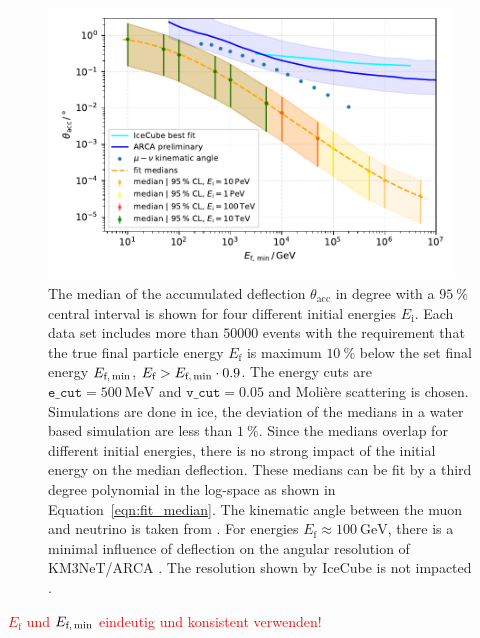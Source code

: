 \documentclass[pdflatex, sn-mathphys]{sn-jnl}%
\theoremstyle{thmstyleone}%
\theoremstyle{thmstyletwo}%
\theoremstyle{thmstylethree}%
\begin{document}
\begin{figure}
    \centering 
    \includegraphics[width=0.96\textwidth]{../../deflection/plots/FINAL/fit_median_defl_cut_10percent_only_poly_new_resolution_rescale_no_icecube_paper_final.pdf}
    \caption{The median of the accumulated deflection $\theta_{\text{acc}}$ in degree 
    with a $\SI{95}{\percent}$ 
    central interval is shown for four different initial energies $E_{\text{i}}$. 
    Each data set includes more than $\num{50000}$ events with the requirement 
    that the true final particle energy $E_{\text{f}}$ is maximum 
    $\SI{10}{\percent}$ below the set final energy $E_{\text{f,\,min}}$,   
    $E_{\text{f}} > E_{\text{f,\,min}} \cdot 0.9$. The energy cuts are $\texttt{e\_cut} = \SI{500}{\mega\electronvolt}$ and $\texttt{v\_cut} = 0.05$ and 
    Molière scattering is chosen. Simulations are done in ice, the deviation 
    of the medians in a water based simulation are less than $\SI{1}{\percent}$.
    Since the medians overlap for different initial energies, there is no 
    strong impact of the initial energy on the median deflection. These 
    medians can be fit by a third degree polynomial in the log-space as 
    shown in Equation~\ref{eqn:fit_median}. The kinematic angle between the muon and 
    neutrino is taken from \cite{KM3NeT_Resolution2016}.
    For energies 
    $E_{\text{f}} \approx \SI{100}{\giga\electronvolt}$, there is a minimal influence of deflection on the angular resolution of 
    KM3NeT/ARCA \cite{KM3NeT_Resolution2021}. The resolution shown by IceCube is not 
    impacted \cite{IceCube_Resolution2021}.}
    \label{fig:fit_median}
\end{figure}

\textcolor{red}{$E_{\text{f}}$ und $E_{\text{f,\,min}}$ eindeutig und konsistent verwenden!}
\end{document}
